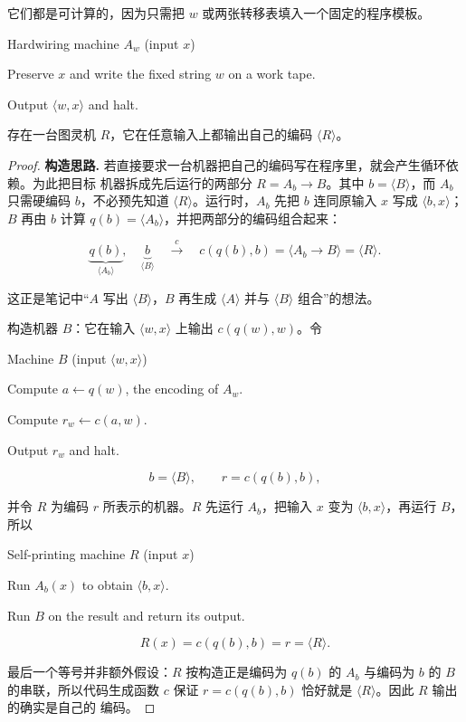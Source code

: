 它们都是可计算的，因为只需把 $w$ 或两张转移表填入一个固定的程序模板。

\begin{pseudocode}{Hardwiring machine $A_w$ (input $x$)}
  \item Preserve $x$ and write the fixed string $w$ on a work tape.
  \item Output $\langle w,x\rangle$ and halt.
\end{pseudocode}

\begin{example}[自打印图灵机]
  \label{ex:self-printing-tm}
  存在一台图灵机 $R$，它在任意输入上都输出自己的编码
  $\langle R\rangle$。
\end{example}

\begin{proof}
  \textbf{构造思路.}
  若直接要求一台机器把自己的编码写在程序里，就会产生循环依赖。为此把目标
  机器拆成先后运行的两部分 $R=A_b\to B$。其中 $b=\langle B\rangle$，而
  $A_b$ 只需硬编码 $b$，不必预先知道 $\langle R\rangle$。运行时，$A_b$
  先把 $b$ 连同原输入 $x$ 写成 $\langle b,x\rangle$；$B$ 再由 $b$ 计算
  $q(b)=\langle A_b\rangle$，并把两部分的编码组合起来：

  \[
    \underbrace{q(b)}_{\langle A_b\rangle},
    \quad
    \underbrace{b}_{\langle B\rangle}
    \quad\xrightarrow{\ c\ }\quad
    c(q(b),b)=\langle A_b\to B\rangle=\langle R\rangle.
  \]

  这正是笔记中“$A$ 写出 $\langle B\rangle$，$B$ 再生成
  $\langle A\rangle$ 并与 $\langle B\rangle$ 组合”的想法。

  构造机器 $B$：它在输入 $\langle w,x\rangle$ 上输出 $c(q(w),w)$。令

  \begin{pseudocode}{Machine $B$ (input $\langle w,x\rangle$)}
    \item Compute $a\gets q(w)$, the encoding of $A_w$.
    \item Compute $r_w\gets c(a,w)$.
    \item Output $r_w$ and halt.
  \end{pseudocode}

  \[
    b=\langle B\rangle,
    \qquad
    r=c(q(b),b),
  \]

  并令 $R$ 为编码 $r$ 所表示的机器。$R$ 先运行 $A_b$，把输入 $x$ 变为
  $\langle b,x\rangle$，再运行 $B$，所以

  \begin{pseudocode}{Self-printing machine $R$ (input $x$)}
    \item Run $A_b(x)$ to obtain $\langle b,x\rangle$.
    \item Run $B$ on the result and return its output.
  \end{pseudocode}

  \[
    R(x)=c(q(b),b)=r=\langle R\rangle.
  \]

  最后一个等号并非额外假设：$R$ 按构造正是编码为 $q(b)$ 的 $A_b$ 与编码为
  $b$ 的 $B$ 的串联，所以代码生成函数 $c$ 保证
  $r=c(q(b),b)$ 恰好就是 $\langle R\rangle$。因此 $R$ 输出的确实是自己的
  编码。
\end{proof}

